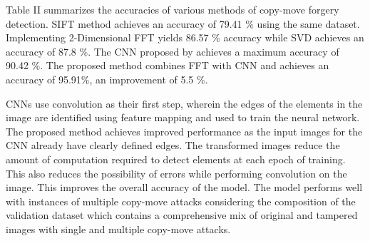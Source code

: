 \documentclass[conference]{IEEEtran}
\begin{document}
\begin{table}[htpb]
\centering
\caption{\label{tab:acc} Comparative Analysis of Accuracies of various Detection Algorithms}
\end{table}

Table II summarizes the accuracies of various methods of copy-move forgery detection. SIFT method \cite{b4} achieves an accuracy of 79.41 \% using the same dataset. Implementing 2-Dimensional FFT \cite{b2} yields 86.57 \% accuracy while SVD \cite{b8} achieves an accuracy of 87.8 \%.  The CNN proposed by \cite{b3} achieves a maximum accuracy of 90.42 \%. The proposed method combines FFT with CNN and achieves an accuracy of 95.91\%, an improvement of 5.5 \%. 


CNNs use convolution as their first step, wherein the edges of the elements in the image are identified using feature mapping and used to train the neural network. The proposed method achieves improved performance as the input images for the CNN already have clearly defined edges. The transformed images reduce the amount of computation required to detect elements at each epoch of training. This also reduces the possibility of errors while performing convolution on the image. This improves the overall accuracy of the model. The model performs well with instances of multiple copy-move attacks considering the composition of the validation dataset which contains a comprehensive mix of original and tampered images with single and multiple copy-move attacks. 
\end{document}
